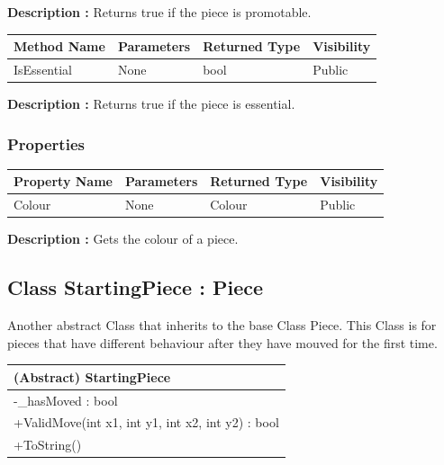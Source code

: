 \documentclass[12pt]{article}
\begin{document}
\textbf{Description :} Returns true if the piece is promotable.

\begin{table}[H]
    \begin{tabular}{|l|l|l|l|}
    \hline
    \rowcolor[HTML]{EFEFEF} 
    \cellcolor[HTML]{EFEFEF}\textbf{Method Name} & \textbf{Parameters}  & \textbf{Returned Type} & \textbf{Visibility} \\ \hline
    IsEssential                                  & None                 & bool                   & Public              \\ \hline
    \end{tabular}
\end{table}

\textbf{Description :} Returns true if the piece is essential.

\subsubsection{Properties}

\begin{table}[H]
    \begin{tabular}{|l|l|l|l|}
    \hline
    \rowcolor[HTML]{EFEFEF} 
    \cellcolor[HTML]{EFEFEF}\textbf{Property Name} & \textbf{Parameters}  & \textbf{Returned Type} & \textbf{Visibility} \\ \hline
    Colour                                         & None                 & Colour                 & Public              \\ \hline
    \end{tabular}
\end{table}

\textbf{Description :} Gets the colour of a piece.
\newpage


\subsection{Class StartingPiece : Piece}

Another abstract Class that inherits to the base Class Piece.
This Class is for pieces that have different behaviour after they
have mouved for the first time.

\begin{table}[H]
    \begin{tabular}{|l|}
    \hline
    \cellcolor[HTML]{C0C0C0}\textbf{(Abstract) StartingPiece}            \\ \hline
    \cellcolor[HTML]{EFEFEF}-\_hasMoved : bool        \\ \hline
    +ValidMove(int x1, int y1, int x2, int y2) : bool \\ \hline
    +ToString()                                       \\ \hline
    \end{tabular}
\end{table}
\end{document}
